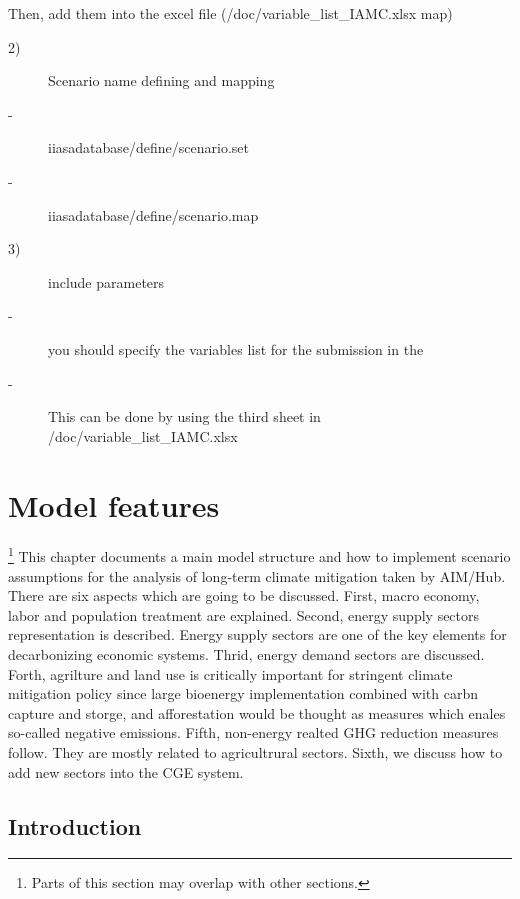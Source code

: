 \documentclass[10pt,a4paper,titlepage,dvipdfmx]{book}
\begin{document}
\begin{itemize}
Then, add them into the excel file (/doc/variable\_list\_IAMC.xlsx map)
\begin{description}
\item[2)]Scenario name defining and mapping
\item[-]iiasadatabase/define/scenario.set
\item[-]iiasadatabase/define/scenario.map
\end{description}

\begin{description}
\item[3)]include parameters
\item[-]you should specify the variables list for the submission in the 
\item[-]This can be done by using the third sheet in /doc/variable\_list\_IAMC.xlsx
\end{description}
\chapter{\label{chp:ModFea}{Model features}}
\footnote{Parts of this section may overlap with other sections.}\label{mark-11.}
This chapter documents a main model structure and how to implement scenario assumptions for the analysis of long-term climate mitigation taken by AIM/Hub. 
There are six aspects which are going to be discussed. First, macro economy, labor and population treatment are explained. Second, energy supply sectors representation is described. 
Energy supply sectors are one of the key elements for decarbonizing economic systems. 
Thrid, energy demand sectors are discussed. 
Forth, agrilture and land use is critically important for stringent climate mitigation policy since large bioenergy implementation combined with carbn capture and storge, and afforestation would be thought as measures which enales so-called negative emissions. 
Fifth, non-energy realted GHG reduction measures follow. They are mostly related to agricultrural sectors. 
Sixth, we discuss how to add new sectors into the CGE system.

\section{\label{sec:SomTIPS-Int}{Introduction}}


\end{itemize}
\end{document}
